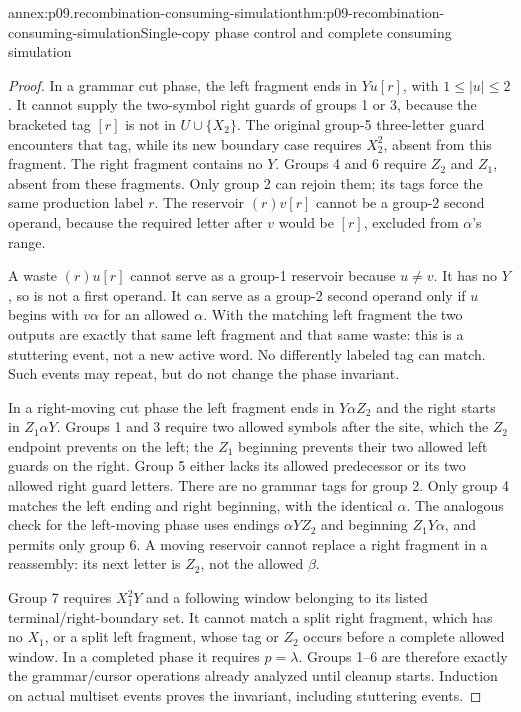 \begin{annexitem}{annex:p09.recombination-consuming-simulation}{thm:p09-recombination-consuming-simulation}{Single-copy phase control and complete consuming simulation}
\begin{proof}
In a grammar cut phase, the left fragment ends in \(Yu[r]\),
with \(1\leq|u|\leq2\).
It cannot supply the two-symbol right guards of groups 1 or 3,
because the bracketed tag \([r]\) is not in \(U\cup\{X_2\}\).
The original group-5 three-letter guard encounters that tag, while its
new boundary case requires \(X_2^2\), absent from this fragment.
The right fragment contains no \(Y\). Groups 4 and 6 require \(Z_2\)
and \(Z_1\), absent from these fragments. Only group 2 can rejoin them;
its tags force the same production label \(r\).
The reservoir \((r)v[r]\) cannot be a group-2 second operand, because
the required letter after \(v\) would be \([r]\), excluded from
\(\alpha\)'s range.

A waste \((r)u[r]\) cannot serve as a group-1 reservoir because
\(u\ne v\). It has no \(Y\), so is not a first operand.
It can serve as a group-2 second operand only if \(u\) begins with
\(v\alpha\) for an allowed \(\alpha\). With the matching left fragment
the two outputs are exactly that same left fragment and that same waste:
this is a stuttering event, not a new active word. No differently labeled
tag can match. Such events may repeat, but do not change the phase invariant.

In a right-moving cut phase the left fragment ends in \(Y\alpha Z_2\)
and the right starts in \(Z_1\alpha Y\).
Groups 1 and 3 require two allowed symbols after the site, which the
\(Z_2\) endpoint prevents on the left; the \(Z_1\) beginning prevents
their two allowed left guards on the right. Group 5 either lacks its
allowed predecessor or its two allowed right guard letters.
There are no grammar tags for group 2. Only group 4 matches the left
ending and right beginning, with the identical \(\alpha\).
The analogous check for the left-moving phase uses endings
\(\alpha YZ_2\) and beginning \(Z_1Y\alpha\), and permits only group 6.
A moving reservoir cannot replace a right fragment in a reassembly:
its next letter is \(Z_2\), not the allowed \(\beta\).

Group 7 requires \(X_1^2Y\) and a following window belonging to its
listed terminal/right-boundary set. It cannot match a split right fragment,
which has no \(X_1\), or a split left fragment, whose tag or \(Z_2\)
occurs before a complete allowed window. In a completed phase it requires
\(p=\lambda\). Groups 1--6 are therefore exactly the grammar/cursor
operations already analyzed until cleanup starts. Induction on actual
multiset events proves the invariant, including stuttering events.


\end{proof}
\end{annexitem}
